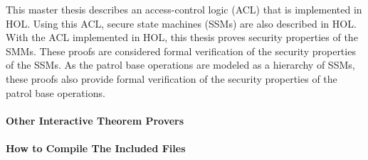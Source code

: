 \documentclass[../../main/main.tex]{subfiles}
\begin{document}
This master thesis describes an access-control logic (ACL) that is implemented in HOL.  Using this ACL, secure state machines (SSMs) are also described in HOL.  With the ACL implemented in HOL, this thesis proves security properties of the SMMs.  These proofs are considered formal verification of the security properties of the SSMs.  As the patrol base operations are modeled as a hierarchy of SSMs, these proofs also provide formal verification of the security properties of the patrol base operations.


\paragraph*{Other Interactive Theorem Provers}
\paragraph*{How to Compile The Included Files}
\end{document}
